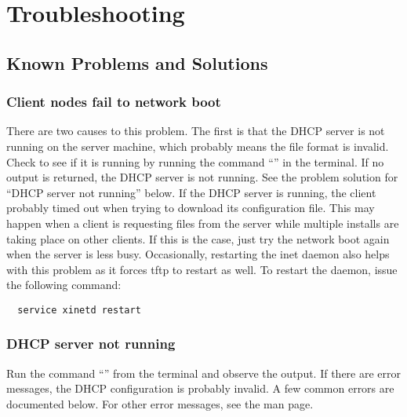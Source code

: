 %
%
%

\section{Troubleshooting}
\label{app:troubleshooting}

\subsection{Known Problems and Solutions}
\label{app:troubleshooting-known-problems}

\subsubsection{Client nodes fail to network boot}
\label{app:troubleshooting-known-problems-dhcp}

There are two causes to this problem. The first is that the DHCP
server is not running on the server machine, which probably means the
 file format is invalid. Check to see if it is
running by running the command ``'' in the
terminal.  If no output is returned, the DHCP server is not running.
See the problem solution for ``DHCP server not running'' below. If the
DHCP server is running, the client probably timed out when trying to
download its configuration file. This may happen when a client is
requesting files from the server while multiple installs are taking
place on other clients. If this is the case, just try the network boot
again when the server is less busy. Occasionally, restarting the inet
daemon also helps with this problem as it forces tftp to restart as
well. To restart the daemon, issue the following command:

\begin{verbatim}
  service xinetd restart
\end{verbatim}

\subsubsection{DHCP server not running}

Run the command ``'' from the terminal and
observe the output. If there are error messages, the DHCP
configuration is probably invalid. A few common errors are documented
below. For other error messages, see the  man page.

